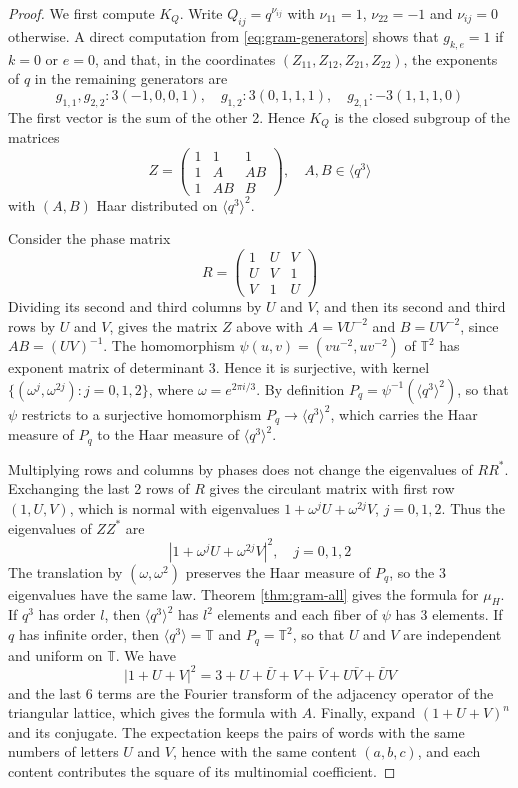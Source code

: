 \documentclass[11pt,reqno]{amsart}
\theoremstyle{definition}
\numberwithin{equation}{section}
\begin{document}
\begin{proof}
We first compute $K_Q$. Write $Q_{ij}=q^{\nu_{ij}}$ with $\nu_{11}=1$, $\nu_{22}=-1$ and $\nu_{ij}=0$ otherwise. A direct computation from \eqref{eq:gram-generators} shows that $g_{k,e}=1$ if $k=0$ or $e=0$, and that, in the coordinates $(Z_{11},Z_{12},Z_{21},Z_{22})$, the exponents of $q$ in the remaining generators are
$$g_{1,1},g_{2,2}:3(-1,0,0,1),\quad g_{1,2}:3(0,1,1,1),\quad g_{2,1}:-3(1,1,1,0)$$
The first vector is the sum of the other 2. Hence $K_Q$ is the closed subgroup of the matrices
$$Z=\begin{pmatrix}1&1&1\\1&A&AB\\1&AB&B\end{pmatrix},
\quad A,B\in\langle q^3\rangle$$
with $(A,B)$ Haar distributed on $\langle q^3\rangle^2$.

Consider the phase matrix
$$R=\begin{pmatrix}1&U&V\\U&V&1\\V&1&U\end{pmatrix}$$
Dividing its second and third columns by $U$ and $V$, and then its second and third rows by $U$ and $V$, gives the matrix $Z$ above with $A=VU^{-2}$ and $B=UV^{-2}$, since $AB=(UV)^{-1}$. The homomorphism $\psi(u,v)=(vu^{-2},uv^{-2})$ of $\mathbb T^2$ has exponent matrix of determinant $3$. Hence it is surjective, with kernel $\{(\omega^j,\omega^{2j}):j=0,1,2\}$, where $\omega=e^{2\pi i/3}$. By definition $P_q=\psi^{-1}(\langle q^3\rangle^2)$, so that $\psi$ restricts to a surjective homomorphism $P_q\to\langle q^3\rangle^2$, which carries the Haar measure of $P_q$ to the Haar measure of $\langle q^3\rangle^2$.

Multiplying rows and columns by phases does not change the eigenvalues of $RR^*$. Exchanging the last 2 rows of $R$ gives the circulant matrix with first row $(1,U,V)$, which is normal with eigenvalues $1+\omega^jU+\omega^{2j}V$, $j=0,1,2$. Thus the eigenvalues of $ZZ^*$ are
$$|1+\omega^jU+\omega^{2j}V|^2,\quad j=0,1,2$$
The translation by $(\omega,\omega^2)$ preserves the Haar measure of $P_q$, so the 3 eigenvalues have the same law. Theorem \ref{thm:gram-all} gives the formula for $\mu_H$. If $q^3$ has order $l$, then $\langle q^3\rangle^2$ has $l^2$ elements and each fiber of $\psi$ has 3 elements. If $q$ has infinite order, then $\langle q^3\rangle=\mathbb T$ and $P_q=\mathbb T^2$, so that $U$ and $V$ are independent and uniform on $\mathbb T$. We have
$$|1+U+V|^2=3+U+\bar U+V+\bar V+U\bar V+\bar UV$$
and the last 6 terms are the Fourier transform of the adjacency operator of the triangular lattice, which gives the formula with $A$. Finally, expand $(1+U+V)^n$ and its conjugate. The expectation keeps the pairs of words with the same numbers of letters $U$ and $V$, hence with the same content $(a,b,c)$, and each content contributes the square of its multinomial coefficient.
\end{proof}
\end{document}
